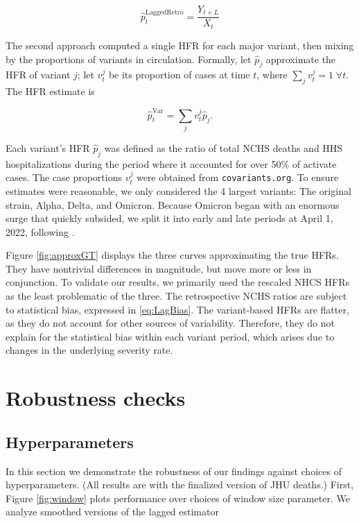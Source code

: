 \documentclass{article}
\begin{document}
\begin{equation}\label{eq:LaggedRetro}
    \hat{p}_t^{\text{LaggedRetro}} = \frac{Y_{t+L}}{X_t}
\end{equation}

The second approach computed a single HFR for each major variant, then mixing by the proportions of variants in circulation. Formally, let $\hat{p}_j$ approximate the HFR of variant $j$; let $v_t^j$ be its proportion of cases at time $t$, where $\sum_j v_t^j = 1 \; \forall t$. The HFR estimate is

$$\hat{p}_t^{\text{Var}} = \sum_j v_t^j \hat{p}_j.$$

Each variant's HFR $\hat p_j$ was defined as the ratio of total NCHS deaths and HHS hospitalizations during the period where it accounted for over 50\% of activate cases. The case proportions $v_t^j$ were obtained from \texttt{covariants.org}. To ensure estimates were reasonable, we only considered the 4 largest variants: The original strain, Alpha, Delta, and Omicron. Because Omicron began with an enormous surge that quickly subsided, we split it into early and late periods at April 1, 2022, following \citep{adjei2022mortality}.

Figure \ref{fig:approxGT} displays the three curves approximating the true HFRs. They have nontrivial differences in magnitude, but move more or less in conjunction. To validate our results, we primarily used the rescaled NHCS HFRs as the least problematic of the three. The retrospective NCHS ratios are subject to statistical bias, expressed in \ref{eq:LagBias}. The variant-based HFRs are flatter, as they do not account for other sources of variability. Therefore, they do not explain for the statistical bias within each variant period, which arises due to changes in the underlying severity rate.  %

\section{Robustness checks}\label{apx:robustness}
\subsection{Hyperparameters}
In this section we demonstrate the robustness of our findings against choices of hyperparameters. (All results are with the finalized version of JHU deaths.) First, Figure \ref{fig:window} plots performance over choices of window size parameter. We analyze smoothed versions of the lagged estimator
\end{document}

